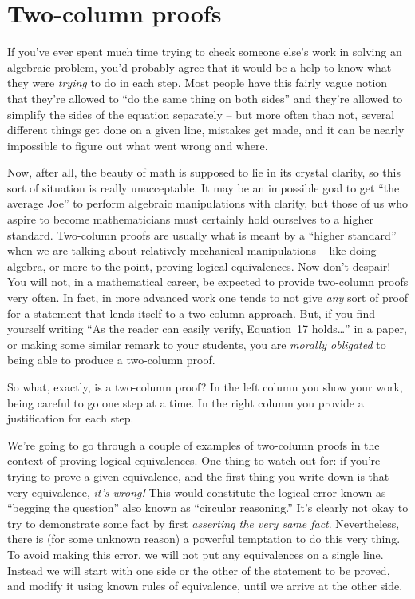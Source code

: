 \clearpage




\newpage
\section{Two-column proofs}
\label{sec:2_col}

If you've ever spent much time trying to check someone else's work
in solving an algebraic problem, you'd probably agree that it 
would be a help to know what they were \emph{trying} to do in each
step.  Most people have this fairly vague notion that they're allowed 
to ``do the same thing on both sides'' and they're allowed to simplify
the sides of the equation separately -- but more often than not, several
different things get done on a given line, mistakes get made, and it can
be nearly impossible to figure out what went wrong and where.

Now, after all, the beauty of math is supposed to lie in its crystal clarity,
so this sort of situation is really unacceptable.  It may be an impossible
goal to get ``the average Joe'' to perform algebraic manipulations with
clarity, but those of us who aspire to become mathematicians must certainly
hold ourselves to a higher standard.  Two-column proofs are usually what 
is meant by a ``higher standard'' when we are talking about relatively
mechanical manipulations -- like doing algebra, or more to the point,
proving logical equivalences.  Now don't despair!  You will not, in 
a mathematical career, be expected to provide two-column proofs very
often.  In fact, in more advanced work one tends to not give \emph{any} sort
of proof for a statement that lends itself to a two-column approach.  But,
if you find yourself writing ``As the reader can easily verify, Equation~17 holds\ldots'' in a paper, or making some similar remark to your students,
you are \emph{morally obligated} to being able to produce a two-column proof.

So what, exactly, is a two-column proof?  In the left column you show your 
work, being careful to go one step at a time.  In the right column you
provide a justification for each step. 

We're going to go through a couple of examples of two-column proofs 
in the context of proving logical equivalences.  One thing to watch out
for: if you're trying to prove a given equivalence, and the first thing 
you write down is that very equivalence, \emph{it's wrong!}  This 
would constitute the logical error known as 
``begging the question'' 
also known as ``circular reasoning.''  
It's clearly not okay to try
to demonstrate some fact by first \emph{asserting the very same fact}.
Nevertheless, there is (for some unknown reason) a powerful temptation
to do this very thing.  To avoid making this error, we will not
put any equivalences on a single line.  Instead we will start with 
one side or the other of the statement to be proved, and modify it
using known rules of equivalence, until we arrive at the other side.

